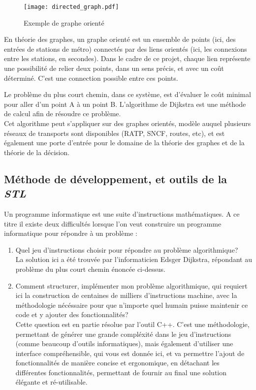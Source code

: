 \documentclass[9pts]{article}
\begin{document}
\begin{figure}[h]
   \centering
   \texttt{[image: directed\_graph.pdf]}
   \caption{\label{directed_graph} Exemple de graphe orienté}
\end{figure}

En théorie des graphes, un graphe orienté est un ensemble de points (ici, des entrées de stations de métro) connectés par des liens orientés (ici, les connexions entre les stations, en secondes). Dans le cadre de ce projet, chaque lien représente une possibilité de relier deux points, dans un sens précis, et avec un coût déterminé. C'est une connection possible entre ces points.

Le problème du plus court chemin, dans ce système, est d'évaluer le coût minimal pour aller d'un point A à un point B. L'algorithme de Dijkstra est une méthode de calcul afin de résoudre ce problème.\\

Cet algorithme peut s'appliquer sur des graphes orientés, modèle auquel plusieurs réseaux de transports sont disponibles (RATP, SNCF, routes, etc), et est également une porte d'entrée pour le domaine de la théorie des graphes et de la théorie de la décision.\\

\subsection{Méthode de développement, et outils de la \emph{STL}}

Un programme informatique est une suite d'instructions mathématiques. A ce titre il existe deux difficultés lorsque l'on veut construire un programme informatique pour répondre à un problème :
\begin{enumerate}
\item Quel jeu d'instructions choisir pour répondre au problème algorithmique?\\
La solution ici a été trouvée par l'informaticien Edsger Dijkstra, répondant au problème du plus court chemin énoncée ci-dessus.

\item Comment structurer, implémenter mon problème algorithmique, qui requiert ici la construction de centaines de milliers d'instructions machine, avec la méthodologie nécéssaire pour que n'importe quel humain puisse maintenir ce code et y ajouter des fonctionnalités?\\
Cette question est en partie résolue par l'outil C++. C'est une méthodologie, permettant de générer une grande compléxité dans le jeu d'instructions (comme beaucoup d'outils informatiques), mais également d'utiliser une interface compréhensible, qui vous est donnée ici, et va permettre l'ajout de fonctionnalités de manière concise et ergonomique, en détachant les différentes fonctionnalités, permettant de fournir au final une solution élégante et ré-utilisable.
\end{enumerate}
\end{document}
